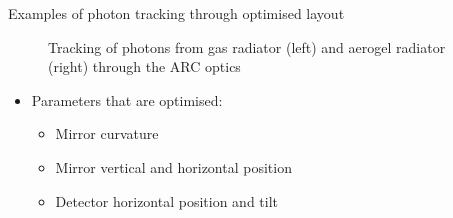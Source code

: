 \documentclass{beamer}
\begin{document}
\begin{frame}{Examples of photon tracking through optimised layout}
\begin{figure}
\begin{subfigure}{0.45\textwidth}
    \end{subfigure}
    \caption{Tracking of photons from gas radiator (left) and aerogel radiator (right) through the ARC optics}
  \end{figure}
  \vspace{-0.3cm}
  \begin{itemize}
    \item{Parameters that are optimised:}
    \begin{itemize}
      \item{Mirror curvature}
      \item{Mirror vertical and horizontal position}
      \item{Detector horizontal position and tilt}
    \end{itemize}
  \end{itemize}
\end{frame}
\end{document}
